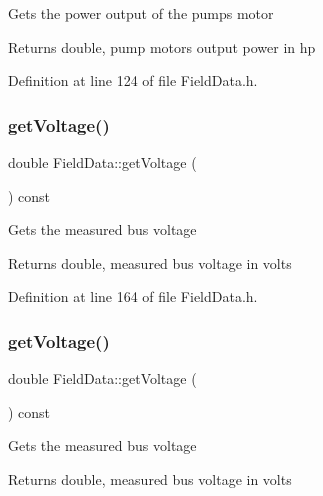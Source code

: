 Gets the power output of the pump\textquotesingle{}s motor

\begin{DoxyReturn}{Returns}
double, pump motor\textquotesingle{}s output power in hp 
\end{DoxyReturn}


Definition at line 124 of file Field\+Data.\+h.

\mbox{\label{class_field_data_a1e8a55965e6cbd8c7b49c0dd5fbee002}} 
\subsubsection{\texorpdfstring{get\+Voltage()}{getVoltage()}\hspace{0.1cm}{\footnotesize\ttfamily [1/3]}}
{\footnotesize\ttfamily double Field\+Data\+::get\+Voltage (\begin{DoxyParamCaption}{ }\end{DoxyParamCaption}) const\hspace{0.3cm}{\ttfamily [inline]}}

Gets the measured bus voltage

\begin{DoxyReturn}{Returns}
double, measured bus voltage in volts 
\end{DoxyReturn}


Definition at line 164 of file Field\+Data.\+h.

\mbox{\label{class_field_data_a1e8a55965e6cbd8c7b49c0dd5fbee002}} 
\subsubsection{\texorpdfstring{get\+Voltage()}{getVoltage()}\hspace{0.1cm}{\footnotesize\ttfamily [2/3]}}
{\footnotesize\ttfamily double Field\+Data\+::get\+Voltage (\begin{DoxyParamCaption}{ }\end{DoxyParamCaption}) const\hspace{0.3cm}{\ttfamily [inline]}}

Gets the measured bus voltage

\begin{DoxyReturn}{Returns}
double, measured bus voltage in volts 
\end{DoxyReturn}


